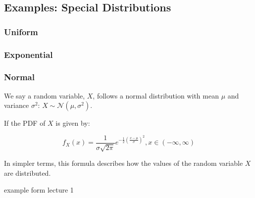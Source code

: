 \documentclass[
  letterpaper,
  DIV=11,
  numbers=noendperiod]{scrreprt}
\begin{document}
\subsection{Examples: Special
Distributions}\label{examples-special-distributions}

\subsubsection{Uniform}\label{uniform}

\subsubsection{Exponential}\label{exponential}

\subsubsection{Normal}\label{normal}

We say a random variable, \(X\), follows a normal distribution with mean
\(\mu\) and variance \(\sigma^2\):
\(X \sim \mathcal{N}(\mu, \sigma^2)\).

If the PDF of \(X\) is given by:

\[
f_X(x) = \frac{1}{\sigma \sqrt{2\pi}} 
  e^{-\frac{1}{2} \left(\frac{x - \mu}{\sigma}\right)^2}, 
  x \in (- \infty, \infty)
\]

In simpler terms, this formula describes how the values of the random
variable \(X\) are distributed.

example form lecture 1
\end{document}
